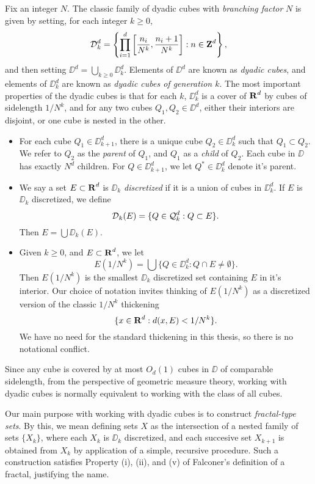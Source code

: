 Fix an integer $N$. The classic family of dyadic cubes with \emph{branching factor} $N$ is given by setting, for each integer $k \geq 0$,
%
\[ \operatorname{\mathcal{D}}_k^d = \left\{ \prod_{i = 1}^d \left[ \frac{n_i}{N^k}, \frac{n_i + 1}{N^k} \right] : n \in \operatorname{\mathbf{Z}}^d \right\}, \]
%
and then setting $\DD^d = \bigcup_{k \geq 0} \DD_k^d$. Elements of $\DD^d$ are known as \emph{dyadic cubes}, and elements of $\DD_k^d$ are known as \emph{dyadic cubes of generation $k$}. The most important properties of the dyadic cubes is that for each $k$, $\DD_k^d$ is a cover of $\operatorname{\mathbf{R}}^d$ by cubes of sidelength $1/N^k$, and for any two cubes $Q_1,Q_2 \in \DD^d$, either their interiors are disjoint, or one cube is nested in the other.
%
\begin{itemize}
	\item For each cube $Q_1 \in \DD_{k+1}^d$, there is a unique cube $Q_2 \in \DD_k^d$ such that $Q_1 \subset Q_2$. We refer to $Q_2$ as the \emph{parent} of $Q_1$, and $Q_1$ as a \emph{child} of $Q_2$. Each cube in $\DD$ has exactly $N^d$ children. For $Q \in \DD_{k+1}^d$, we let $Q^* \in \DD_k^d$ denote it's parent.

	\item We say a set $E \subset \operatorname{\mathbf{R}}^d$ is \emph{$\DD_k$ discretized} if it is a union of cubes in $\DD_k^d$. If $E$ is $\DD_k$ discretized, we define
	\[ \operatorname{\mathcal{D}}_k(E) = \{ Q \in \operatorname{\mathcal{Q}}_k^d : Q \subset E \}. \]
	Then $E = \bigcup \DD_k(E)$.

	\item Given $k \geq 0$, and $E \subset \operatorname{\mathbf{R}}^d$, we let
	\[ E(1/N^k) = \bigcup \{ Q \in \DD_k^d : Q \cap E \neq \emptyset \}. \]
	Then $E(1/N^k)$ is the smallest $\DD_k$ discretized set containing $E$ in it's interior. Our choice of notation invites thinking of $E(1/N^k)$ as a discretized version of the classic $1/N^k$ thickening
	\[ \{ x \in \operatorname{\mathbf{R}}^d : d(x,E) < 1/N^k \}. \]
	We have no need for the standard thickening in this thesis, so there is no notational conflict.
\end{itemize}
%
Since any cube is covered by at most $O_d(1)$ cubes in $\DD$ of comparable sidelength, from the perspective of geometric measure theory, working with dyadic cubes is normally equivalent to working with the class of all cubes.

Our main purpose with working with dyadic cubes is to construct \emph{fractal-type sets}. By this, we mean defining sets $X$ as the intersection of a nested family of sets $\{ X_k \}$, where each $X_k$ is $\DD_k$ discretized, and each succesive set $X_{k+1}$ is obtained from $X_k$ by application of a simple, recursive procedure. Such a construction satisfies Property (i), (ii), and (v) of Falconer's definition of a fractal, justifying the name.

